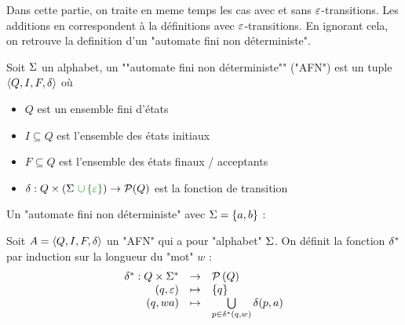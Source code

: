 Dans cette partie, on traite en meme temps les cas avec et sans $\varepsilon$-transitions. Les additions en
 correspondent à la définitions avec $\varepsilon$-transitions. En ignorant cela, on retrouve la
definition d'un "automate fini non déterministe".

\begin{definition}
	Soit $\Sigma$ un alphabet, un ""automate fini non déterministe"" ("AFN") est un tuple $\langle Q, I, F, \delta \rangle$ où
	\begin{itemize}
		\item $Q$ est un ensemble fini d'états
		\item $I \subseteq Q$ est l'ensemble des états initiaux
		\item $F \subseteq Q$ est l'ensemble des états finaux / acceptants
		\item $\delta : Q \times (\alphabet \darkgreen {\ \cup \set\motvide}) \to \mathcal{P}(Q)$ est la fonction de transition
	\end{itemize}
\end{definition}


\begin{exemple}
	Un "automate fini non déterministe" avec $\Sigma = \left\{a, b\right\}$ :
	\begin{center}
		\begin{automata}

		\end{automata}
	\end{center}
\end{exemple}


\begin{definition}
	Soit $A = \langle Q, I, F, \delta \rangle$ un "AFN" qui a pour "alphabet" $\Sigma$. On définit la fonction $\delta^{*}$ par induction sur la longueur du "mot" $w$ :
	$$ \begin{array}{rcl}
			\delta^{*} : Q \times \Sigma^{*} & \to     & \mathcal{P}\left(Q\right)                                                  \\
			(q, \varepsilon)                   & \mapsto & \left\{q\right\}                                                    \\
			(q, wa)                         & \mapsto & \bigcup\limits_{p \in \delta^{*} (q, w)} \delta(p, a)
		\end{array} $$
\end{definition}


